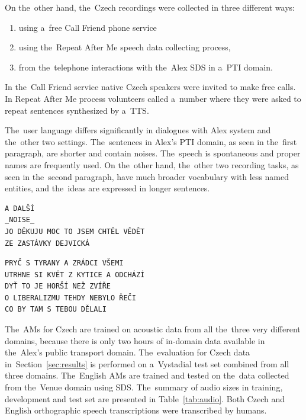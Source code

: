 On the~other hand, the~Czech recordings were collected in three different ways\cite{korvas_2014}:
\begin{enumerate}
    \item using a~free Call Friend phone service
    \item using the~Repeat After Me speech data collecting process,
    \item from the~telephone interactions with the~Alex \ac{SDS} in a~\ac{PTI} domain.
\end{enumerate}

In the~Call Friend service native Czech speakers were invited to make free calls.
In Repeat After Me process volunteers called a~number where they were asked to repeat 
sentences synthesized by a~\ac{TTS}.

The~user language differs significantly in dialogues with Alex system and the~other two settings.
The~sentences in Alex's \ac{PTI} domain, as seen in the~first paragraph, are shorter and contain noises.
The~speech is spontaneous and proper names are frequently used.
On the~other hand, the~other two recording tasks, as seen in the~second paragraph, have much broader vocabulary with less named entities, and the~ideas are expressed in longer sentences.

\begin{verbatim}
A DALŠÍ
_NOISE_
JO DĚKUJU MOC TO JSEM CHTĚL VĚDĚT
ZE ZASTÁVKY DEJVICKÁ
\end{verbatim}

\begin{verbatim}
PRYČ S TYRANY A ZRÁDCI VŠEMI
UTRHNE SI KVĚT Z KYTICE A ODCHÁZÍ
DYŤ TO JE HORŠÍ NEŽ ZVÍŘE
O LIBERALIZMU TEHDY NEBYLO ŘEČI
CO BY TAM S TEBOU DĚLALI
\end{verbatim}


The~\acp{AM} for Czech are trained on acoustic data from all the~three very different domains, because there is only two hours of in-domain data available in the~Alex's public transport domain.
The~evaluation for Czech data in~Section~\ref{sec:results} is performed  on a~Vystadial test set combined from all three domains.
The~English \acp{AM} are trained and tested on the~data collected from the~Venue domain using \ac{SDS}.
The~summary of audio sizes in training, development and test set are presented in Table~\ref{tab:audio}.
Both Czech and English orthographic speech transcriptions were transcribed by humans.

